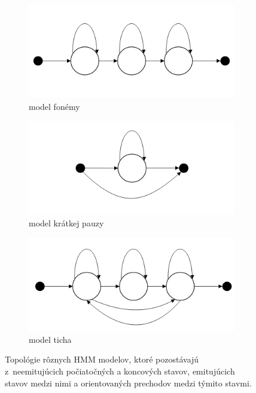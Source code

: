 \begin{figure}
    \begin{subfigure}{.5\textwidth}
        \centering
        \includegraphics[width=\linewidth]{figures/hmm-phone.png}   
        \caption{model fonémy}
        \label{fig:hmm-phone}
    \end{subfigure}
    \begin{subfigure}{.5\textwidth}
        \centering
        \includegraphics[width=\linewidth]{figures/hmm-sp.png}   
        \caption{model krátkej pauzy}
        \label{fig:hmm-sp}
    \end{subfigure}
    \begin{subfigure}{.5\textwidth}
        \centering
        \includegraphics[width=\linewidth]{figures/hmm-sil.png}   
        \caption{model ticha}
        \label{fig:hmm-sil}
    \end{subfigure}
    \caption{Topológie rôznych HMM modelov, ktoré pozostávajú z~neemitujúcich počiatočných a koncových stavov, emitujúcich stavov medzi nimi a orientovaných prechodov medzi týmito stavmi.}
    \label{fig:hmm-topology}
\end{figure}

